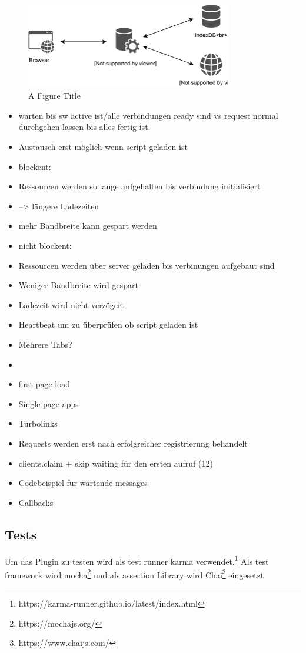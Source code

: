 \begin{figure}[!h]
	\centering
	\includegraphics[width=0.8\textwidth]{figures/ServiceWorker}
	\caption[A Figure Short-Title]{A Figure Title}
	\label{fig:sequenceDiagram}
\end{figure}
\begin{itemize}
  \item warten bis sw active ist/alle verbindungen ready sind vs request normal durchgehen lassen bis alles fertig ist.
  \item 	Austausch erst möglich wenn script geladen ist
  \item 	blockent: 
  \item 		Ressourcen werden so lange aufgehalten bis verbindung initialisiert
  \item 		--> längere Ladezeiten
  \item 		mehr Bandbreite kann gespart werden
  \item 	nicht blockent: 
  \item 		Ressourcen werden über server geladen bis verbinungen aufgebaut sind
  \item 		Weniger Bandbreite wird gespart
  \item 		Ladezeit wird nicht verzögert
  \item 		Heartbeat um zu überprüfen ob script geladen ist
  \item Mehrere Tabs?
  \item 		
  \item first page load
  \item Single page apps
  \item Turbolinks
  \item Requests werden erst nach erfolgreicher registrierung behandelt
  \item clients.claim + skip waiting für den ersten aufruf (12)
  \item Codebeispiel für wartende messages
  \item 	Callbacks
\end{itemize}

\subsection{Tests}
Um das Plugin zu testen wird als test runner karma verwendet.\footnote{https://karma-runner.github.io/latest/index.html} Als test framework wird mocha\footnote{https://mochajs.org/} und als assertion Library wird Chai\footnote{https://www.chaijs.com/} eingesetzt 

